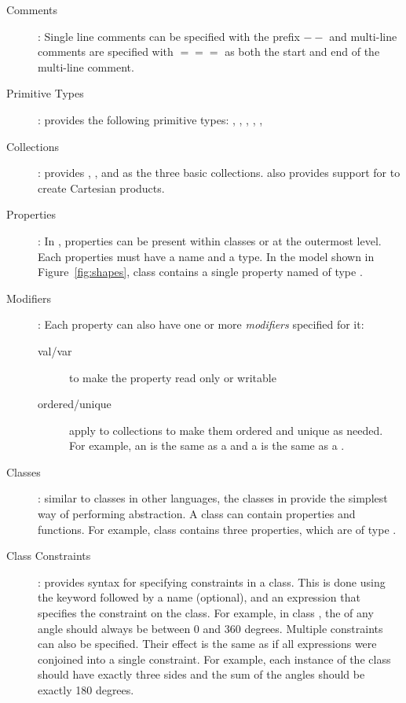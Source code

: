 \begin{description}

\item [Comments]: Single line comments can be specified with the
  prefix $--$ and multi-line comments are specified with $===$ as both
  the start and end of the multi-line comment.

\item [Primitive Types]: \Klang{} provides the following primitive
  types: , , , ,
  , 

\item [Collections]: \Klang{} provides , , and
   as the three basic collections. \Klang{} also provides
  support for  to create Cartesian products. 

\item [Properties]: In \Klang{}, properties can be present within
  classes or at the outermost level. Each properties must have a name
  and a type. In the model shown in Figure~\ref{fig:shapes}, class
   contains a single property named  of type
  .

\item [Modifiers]: Each property can also have one or more
  \emph{modifiers} specified for it:
  \begin{description}
    \item [val/var] to make the property read only or writable
    \item [ordered/unique] apply to collections to make them ordered
      and unique as needed. For example, an  is the
      same as a  and a  is the same as a
      .
  \end{description}

\item [Classes]: similar to classes in other languages, the classes in
  \Klang{} provide the simplest way of performing abstraction. A class
  can contain properties and functions. For example, class
   contains three properties, which are of type
  .
  
\item [Class Constraints]: \Klang{} provides syntax for specifying
  constraints in a class. This is done using the  keyword
  followed by a name (optional), and an expression that specifies the
  constraint on the class. For example, in class , the
   of any angle should always be between 0 and 360
  degrees. Multiple constraints can also be specified. Their effect is
  the same as if all expressions were conjoined into a single
  constraint. For example, each instance of the  class
  should have exactly three sides and the sum of the angles should be
  exactly 180 degrees.
  

\end{description}
